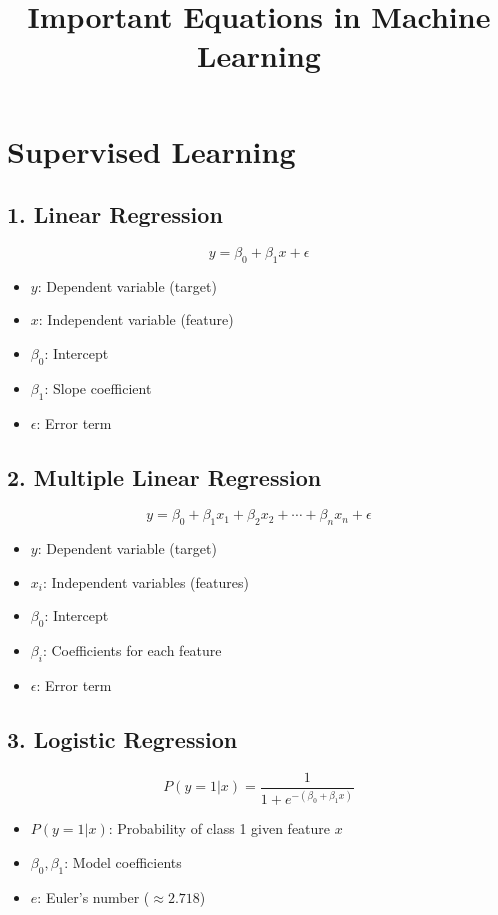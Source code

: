 \documentclass{article}
\begin{document}
\title{Important Equations in Machine Learning}
\maketitle

\section{Supervised Learning}

\subsection{1. Linear Regression}
\begin{equation}
y = \beta_0 + \beta_1 x + \epsilon
\end{equation}
\begin{itemize}
    \item \(y\): Dependent variable (target)
    \item \(x\): Independent variable (feature)
    \item \(\beta_0\): Intercept
    \item \(\beta_1\): Slope coefficient
    \item \(\epsilon\): Error term
\end{itemize}

\subsection{2. Multiple Linear Regression}
\begin{equation}
y = \beta_0 + \beta_1 x_1 + \beta_2 x_2 + \cdots + \beta_n x_n + \epsilon
\end{equation}
\begin{itemize}
    \item \(y\): Dependent variable (target)
    \item \(x_i\): Independent variables (features)
    \item \(\beta_0\): Intercept
    \item \(\beta_i\): Coefficients for each feature
    \item \(\epsilon\): Error term
\end{itemize}

\subsection{3. Logistic Regression}
\begin{equation}
P(y=1|x) = \frac{1}{1 + e^{-(\beta_0 + \beta_1 x)}}
\end{equation}
\begin{itemize}
    \item \(P(y=1|x)\): Probability of class 1 given feature \(x\)
    \item \(\beta_0, \beta_1\): Model coefficients
    \item \(e\): Euler’s number (\(\approx 2.718\))
\end{itemize}
\end{document}
